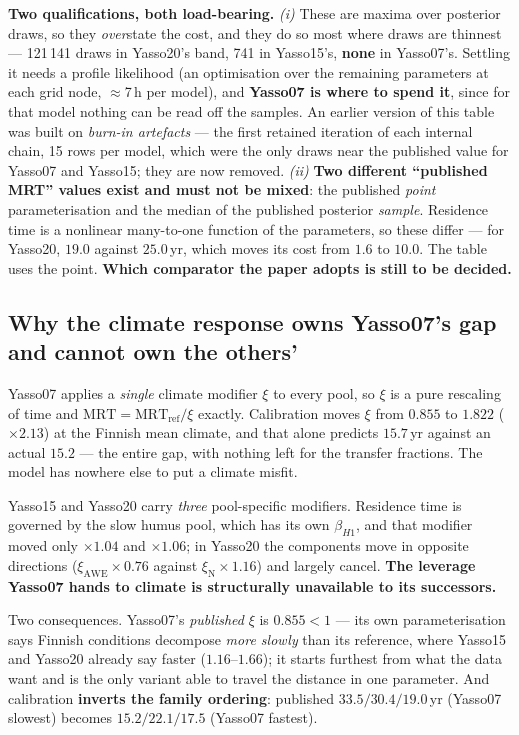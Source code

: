 \documentclass[11pt]{article}
\begin{document}
\begin{caveat}
\textbf{Two qualifications, both load-bearing.} \emph{(i)} These are maxima over posterior draws, so
they \emph{over}state the cost, and they do so most where draws are thinnest --- 121\,141 draws in
Yasso20's band, 741 in Yasso15's, \textbf{none} in Yasso07's. Settling it needs a profile likelihood
(an optimisation over the remaining parameters at each grid node, $\approx$7\,h per model), and
\textbf{Yasso07 is where to spend it}, since for that model nothing can be read off the samples.
An earlier version of this table was built on \emph{burn-in artefacts} --- the first retained iteration
of each internal chain, 15 rows per model, which were the only draws near the published value for
Yasso07 and Yasso15; they are now removed. \emph{(ii)} \textbf{Two
different ``published MRT'' values exist and must not be mixed}: the published \emph{point}
parameterisation and the median of the published posterior \emph{sample}. Residence time is a
nonlinear many-to-one function of the parameters, so these differ --- for Yasso20, $19.0$ against
$25.0$\,yr, which moves its cost from $1.6$ to $10.0$. The table uses the point. \textbf{Which
comparator the paper adopts is still to be decided.}
\end{caveat}

\subsection*{Why the climate response owns Yasso07's gap and cannot own the others'}

Yasso07 applies a \emph{single} climate modifier $\xi$ to every pool, so $\xi$ is a pure rescaling of
time and $\mathrm{MRT}=\mathrm{MRT}_{\mathrm{ref}}/\xi$ exactly. Calibration moves $\xi$ from $0.855$
to $1.822$ ($\times2.13$) at the Finnish mean climate, and that alone predicts $15.7$\,yr against an
actual $15.2$ --- the entire gap, with nothing left for the transfer fractions. The model has nowhere
else to put a climate misfit.

Yasso15 and Yasso20 carry \emph{three} pool-specific modifiers. Residence time is governed by the
slow humus pool, which has its own $\beta_{H1}$, and that modifier moved only $\times1.04$ and
$\times1.06$; in Yasso20 the components move in opposite directions ($\xi_{\mathrm{AWE}}\times0.76$
against $\xi_{\mathrm{N}}\times1.16$) and largely cancel. \textbf{The leverage Yasso07 hands to
climate is structurally unavailable to its successors.}

Two consequences. Yasso07's \emph{published} $\xi$ is $0.855<1$ --- its own parameterisation says
Finnish conditions decompose \emph{more slowly} than its reference, where Yasso15 and Yasso20 already
say faster ($1.16$--$1.66$); it starts furthest from what the data want and is the only variant able
to travel the distance in one parameter. And calibration \textbf{inverts the family ordering}:
published $33.5/30.4/19.0$\,yr (Yasso07 slowest) becomes $15.2/22.1/17.5$ (Yasso07 fastest).
\end{document}
